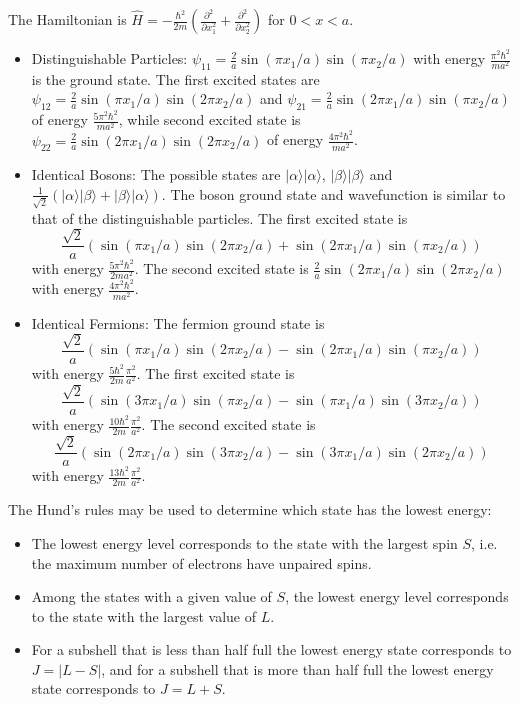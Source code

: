 \documentclass[a4paper]{article}
\begin{document}
\begin{eg}
The Hamiltonian is $\hat{H}=-\frac{\hbar^2}{2m}(\frac{\partial^2}{\partial x_1^2}+\frac{\partial^2}{\partial x_2^2})$ for $0<x<a$.
\begin{itemize}
    \item Distinguishable Particles: $\psi_{11}=\frac{2}{a}\sin(\pi x_1/a)\sin(\pi x_2/a)$ with energy $\frac{\pi^2\hbar^2}{ma^2}$ is the ground state. The first excited states are $\psi_{12}=\frac{2}{a}\sin(\pi x_1/a)\sin(2\pi x_2/a)$ and $\psi_{21}=\frac{2}{a}\sin(2\pi x_1/a)\sin(\pi x_2/a)$ of energy $\frac{5\pi^2\hbar^2}{ma^2}$, while second excited state is $\psi_{22}=\frac{2}{a}\sin(2\pi x_1/a)\sin(2\pi x_2/a)$ of energy $\frac{4\pi^2\hbar^2}{ma^2}$.
    \item Identical Bosons: The possible states are $|\alpha\rangle|\alpha\rangle$, $|\beta\rangle|\beta\rangle$ and $\frac{1}{\sqrt{2}}(|\alpha\rangle|\beta\rangle+|\beta\rangle|\alpha\rangle)$. The boson ground state and wavefunction is similar to that of the distinguishable particles. The first excited state is
    $$\frac{\sqrt{2}}{a}(\sin(\pi x_1/a)\sin(2\pi x_2/a)+\sin(2\pi x_1/a)\sin(\pi x_2/a))$$
    with energy $\frac{5\pi^2\hbar^2}{2ma^2}$. The second excited state is $\frac{2}{a}\sin(2\pi x_1/a)\sin(2\pi x_2/a)$ with energy  $\frac{4\pi^2\hbar^2}{ma^2}$.
    \item Identical Fermions: The fermion ground state is 
$$\frac{\sqrt{2}}{a}(\sin(\pi x_1/a)\sin(2\pi x_2/a)-\sin(2\pi x_1/a)\sin(\pi x_2/a))$$
with energy $\frac{5\hbar^2}{2m}\frac{\pi^2}{a^2}$. The first excited state is
$$\frac{\sqrt{2}}{a}(\sin(3\pi x_1/a)\sin(\pi x_2/a)-\sin(\pi x_1/a)\sin(3\pi x_2/a))$$
with energy $\frac{10\hbar^2}{2m}\frac{\pi^2}{a^2}$. The second excited state is $$\frac{\sqrt{2}}{a}(\sin(2\pi x_1/a)\sin(3\pi x_2/a)-\sin(3\pi x_1/a)\sin(2\pi x_2/a))$$
with energy $\frac{13\hbar^2}{2m}\frac{\pi^2}{a^2}$.
\end{itemize}
\end{eg}
\begin{defi}
The Hund's rules may be used to determine which state has the lowest energy:
\begin{itemize}
    \item The lowest energy level corresponds to the state with the largest spin $S$, i.e. the maximum number of electrons have unpaired spins.
    \item Among the states with a given value of $S$, the lowest energy level corresponds to the state with the largest value of $L$.
    \item For a subshell that is less than half full the lowest energy state corresponds to $J=|L-S|$, and for a subshell that is more than half full the lowest energy state corresponds to $J=L+S$.
\end{itemize}
\end{defi}
\end{document}
